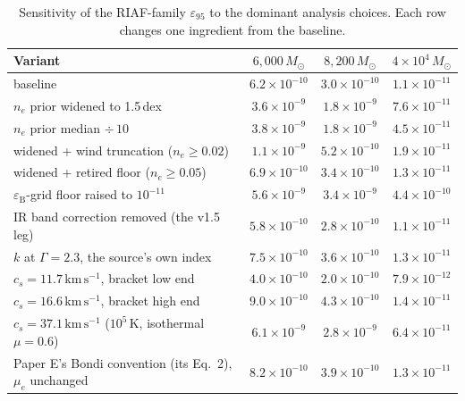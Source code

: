 \documentclass[11pt]{article}
\newcommand{\msun}{\ensuremath{M_\odot}}
\newcommand{\eps}{\ensuremath{\varepsilon_{\mathrm{B}}}}
\newcommand{\epsl}{\ensuremath{\varepsilon_{95}}}
\begin{document}
\begin{table}[tbp]
\centering
\small
\caption{Sensitivity of the RIAF-family \epsl{} to the dominant analysis choices. Each row changes one ingredient from the baseline.}
\label{tab:sens}
\begin{tabular}{lccc}
\toprule
Variant & $6{,}000\,\msun$ & $8{,}200\,\msun$ & $4\times10^{4}\,\msun$ \\
\midrule
baseline & $6.2\times10^{-10}$ & $3.0\times10^{-10}$ & $1.1\times10^{-11}$ \\
$n_{e}$ prior widened to 1.5\,dex & $3.6\times10^{-9}$ & $1.8\times10^{-9}$ & $7.6\times10^{-11}$ \\
$n_{e}$ prior median $\div\,10$ & $3.8\times10^{-9}$ & $1.8\times10^{-9}$ & $4.5\times10^{-11}$ \\
widened + wind truncation ($n_{e} \geq 0.02$) & $1.1\times10^{-9}$ & $5.2\times10^{-10}$ & $1.9\times10^{-11}$ \\
widened + retired floor ($n_{e} \geq 0.05$) & $6.9\times10^{-10}$ & $3.4\times10^{-10}$ & $1.3\times10^{-11}$ \\
$\eps$-grid floor raised to $10^{-11}$ & $5.6\times10^{-9}$ & $3.4\times10^{-9}$ & $4.4\times10^{-10}$ \\
IR band correction removed (the v1.5 leg) & $5.8\times10^{-10}$ & $2.8\times10^{-10}$ & $1.1\times10^{-11}$ \\
$k$ at $\Gamma = 2.3$, the source's own index & $7.5\times10^{-10}$ & $3.6\times10^{-10}$ & $1.3\times10^{-11}$ \\
$c_{s} = 11.7\,\mathrm{km\,s^{-1}}$, bracket low end & $4.0\times10^{-10}$ & $2.0\times10^{-10}$ & $7.9\times10^{-12}$ \\
$c_{s} = 16.6\,\mathrm{km\,s^{-1}}$, bracket high end & $9.0\times10^{-10}$ & $4.3\times10^{-10}$ & $1.4\times10^{-11}$ \\
$c_{s} = 37.1\,\mathrm{km\,s^{-1}}$ ($10^{5}$\,K, isothermal $\mu{=}0.6$) & $6.1\times10^{-9}$ & $2.8\times10^{-9}$ & $6.4\times10^{-11}$ \\
Paper E's Bondi convention (its Eq.~2), $\mu_{e}$ unchanged & $8.2\times10^{-10}$ & $3.9\times10^{-10}$ & $1.3\times10^{-11}$ \\
\bottomrule
\end{tabular}
\end{table}
\end{document}

